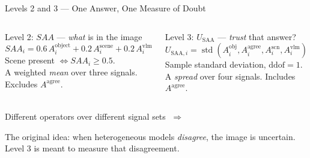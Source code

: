\documentclass[aspectratio=169,11pt]{beamer}
\begin{document}
\begin{frame}{Levels 2 and 3 --- One Answer, One Measure of Doubt}
\begin{columns}[T]
\begin{block}{\small Level 2: $SAA$ --- \emph{what} is in the image}
\footnotesize
\[
SAA_i = 0.6\,A_i^{\text{object}} + 0.2\,A_i^{\text{scene}} + 0.2\,A_i^{\text{vlm}}
\]
Scene present $\iff SAA_i \ge 0.5$.\\[1mm]
A weighted \emph{mean} over three signals. Excludes $A^{\text{agree}}$.
\end{block}

\begin{block}{\small Level 3: $U_{\text{SAA}}$ --- \emph{trust} that answer?}
\footnotesize
\[
U_{\text{SAA},i} = \operatorname{std}\!\left(A^{\text{obj}}_i, A^{\text{agree}}_i, A^{\text{scn}}_i, A^{\text{vlm}}_i\right)
\]
Sample standard deviation, $\text{ddof}=1$.\\[1mm]
A \emph{spread} over four signals. Includes $A^{\text{agree}}$.
\end{block}
\end{columns}
\vspace{2mm}
\begin{center}
\footnotesize Different operators over different signal sets $\;\Rightarrow\;$ 
\end{center}
\vspace{1mm}
\footnotesize The original idea: when heterogeneous models \emph{disagree}, the image is uncertain. Level 3 is meant to measure that disagreement.
\end{frame}
\end{document}
